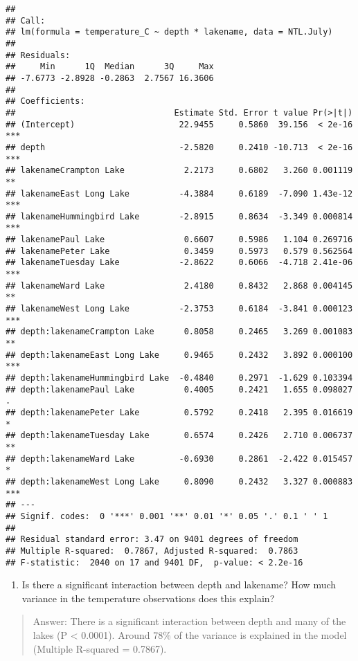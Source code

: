 \documentclass[]{article}
\providecommand{\tightlist}{%
  \setlength{\itemsep}{0pt}\setlength{\parskip}{0pt}}
\begin{document}
\begin{verbatim}
## 
## Call:
## lm(formula = temperature_C ~ depth * lakename, data = NTL.July)
## 
## Residuals:
##     Min      1Q  Median      3Q     Max 
## -7.6773 -2.8928 -0.2863  2.7567 16.3606 
## 
## Coefficients:
##                                Estimate Std. Error t value Pr(>|t|)    
## (Intercept)                     22.9455     0.5860  39.156  < 2e-16 ***
## depth                           -2.5820     0.2410 -10.713  < 2e-16 ***
## lakenameCrampton Lake            2.2173     0.6802   3.260 0.001119 ** 
## lakenameEast Long Lake          -4.3884     0.6189  -7.090 1.43e-12 ***
## lakenameHummingbird Lake        -2.8915     0.8634  -3.349 0.000814 ***
## lakenamePaul Lake                0.6607     0.5986   1.104 0.269716    
## lakenamePeter Lake               0.3459     0.5973   0.579 0.562564    
## lakenameTuesday Lake            -2.8622     0.6066  -4.718 2.41e-06 ***
## lakenameWard Lake                2.4180     0.8432   2.868 0.004145 ** 
## lakenameWest Long Lake          -2.3753     0.6184  -3.841 0.000123 ***
## depth:lakenameCrampton Lake      0.8058     0.2465   3.269 0.001083 ** 
## depth:lakenameEast Long Lake     0.9465     0.2432   3.892 0.000100 ***
## depth:lakenameHummingbird Lake  -0.4840     0.2971  -1.629 0.103394    
## depth:lakenamePaul Lake          0.4005     0.2421   1.655 0.098027 .  
## depth:lakenamePeter Lake         0.5792     0.2418   2.395 0.016619 *  
## depth:lakenameTuesday Lake       0.6574     0.2426   2.710 0.006737 ** 
## depth:lakenameWard Lake         -0.6930     0.2861  -2.422 0.015457 *  
## depth:lakenameWest Long Lake     0.8090     0.2432   3.327 0.000883 ***
## ---
## Signif. codes:  0 '***' 0.001 '**' 0.01 '*' 0.05 '.' 0.1 ' ' 1
## 
## Residual standard error: 3.47 on 9401 degrees of freedom
## Multiple R-squared:  0.7867, Adjusted R-squared:  0.7863 
## F-statistic:  2040 on 17 and 9401 DF,  p-value: < 2.2e-16
\end{verbatim}

\begin{enumerate}
\def\labelenumi{\arabic{enumi}.}
\setcounter{enumi}{6}
\tightlist
\item
  Is there a significant interaction between depth and lakename? How
  much variance in the temperature observations does this explain?
\end{enumerate}

\begin{quote}
Answer: There is a significant interaction between depth and many of the
lakes (P \textless{} 0.0001). Around 78\% of the variance is explained
in the model (Multiple R-squared = 0.7867).
\end{quote}
\end{document}
